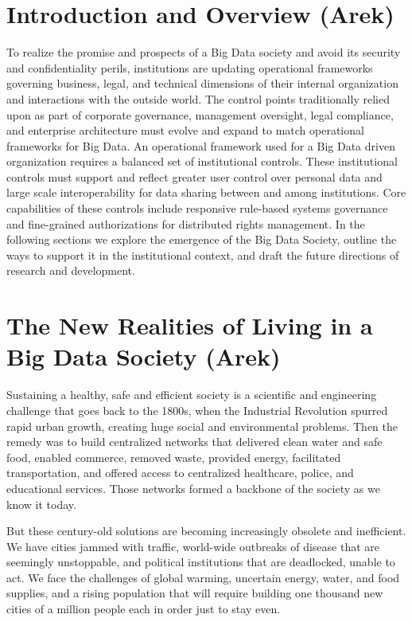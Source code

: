 \section{Introduction and Overview (Arek)}

To realize the promise and prospects of a Big Data society and avoid its security and confidentiality perils, institutions are updating operational frameworks governing business, legal, and technical dimensions of their internal organization and interactions with the outside world.
The control points traditionally relied upon as part of corporate governance, management oversight, legal compliance, and enterprise architecture must evolve and expand to match operational frameworks for Big Data.
An operational framework used for a Big Data driven organization requires a balanced set of institutional controls.
These institutional controls must support and reflect greater user control over personal data and large scale interoperability for data sharing between and among institutions.
Core capabilities of these controls include responsive rule-based systems governance and fine-grained authorizations for distributed rights management.
In the following sections we explore the emergence of the Big Data Society, outline the ways to support it in the institutional context, and draft the future directions of research and development.

\section{The New Realities of Living in a Big Data Society (Arek)}

Sustaining a healthy, safe and efficient society is a scientific and engineering challenge that goes back to the 1800s, when the Industrial Revolution spurred rapid urban growth, creating huge social and environmental problems.
Then the remedy was to build centralized networks that delivered clean water and safe food, enabled commerce, removed waste, provided energy, facilitated transportation, and offered access to centralized healthcare, police, and educational services.
Those networks formed a backbone of the society as we know it today.

But these century-old solutions are becoming increasingly obsolete and inefficient.
We have cities jammed with traffic, world-wide outbreaks of disease that are seemingly unstoppable, and political institutions that are deadlocked, unable to act.
We face the challenges of global warming, uncertain energy, water, and food supplies, and a rising population that will require building one thousand new cities of a million people each in order just to stay even. 

